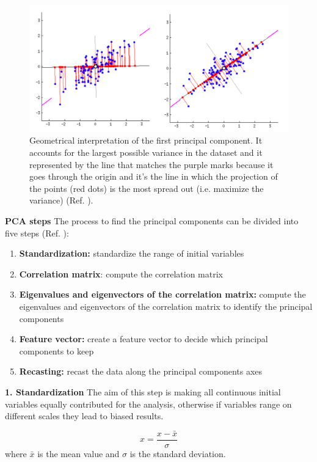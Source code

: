 \documentclass[english,notitlepage,reprint,nofootinbib]{revtex4-1}  %
\begin{document}
\begin{figure}[h]
    \centering 
    \includegraphics[scale=0.4]{img/PC_2.png}
    \caption{Geometrical interpretation of the first principal component. It accounts for the largest possible variance in the dataset and it represented by the line that matches the purple marks because it goes through the origin and it’s the line in which the projection of the points (red dots) is the most spread out (i.e. maximize the variance) (Ref. \cite{pc}).}
    \label{fig:PC2}
\end{figure}

\textbf{PCA steps} The process to find the principal components can be divided into five steps (Ref. \cite{pc}):

\begin{enumerate}
    \item \textbf{Standardization:} standardize the range of initial variables
    \item \textbf{Correlation matrix}: compute the correlation matrix
    \item \textbf{Eigenvalues and eigenvectors of the correlation matrix:} compute the eigenvalues and eigenvectors of the correlation matrix to identify the principal components
    \item \textbf{Feature vector:} create a feature vector to decide which principal components to keep
    \item \textbf{Recasting:} recast the data along the principal components axes
\end{enumerate}

\textbf{1. Standardization} The aim of this step is making all continuous initial variables equally contributed for the analysis, otherwise if variables range on different scales they lead to biased results.

\begin{equation}
    x = \frac{x -\bar{x}}{\sigma}
\end{equation}
where $\bar{x}$ is the mean value and $\sigma$ is the standard deviation.
\end{document}
